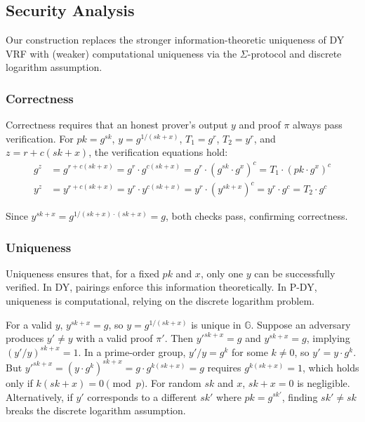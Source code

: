 \subsection{Security Analysis}

Our construction replaces the stronger information-theoretic uniqueness of DY VRF with (weaker) computational uniqueness via the $\Sigma$-protocol and discrete logarithm assumption.


\subsubsection{Correctness}

Correctness requires that an honest prover’s output $y$ and proof $\pi$ always pass verification. For $pk = g^{sk}$, $y = g^{1/(sk + x)}$, $T_1 = g^r$, $T_2 = y^r$, and $z = r + c(sk + x)$, the verification equations hold:
\begin{align*}
g^z &= g^{r + c(sk + x)} = g^r \cdot g^{c(sk + x)} = g^r \cdot (g^{sk} \cdot g^x)^c = T_1 \cdot (pk \cdot g^x)^c \\
y^z &= y^{r + c(sk + x)} = y^r \cdot y^{c(sk + x)} = y^r \cdot (y^{sk + x})^c = y^r \cdot g^c = T_2 \cdot g^c
\end{align*}

Since $y^{sk + x} = g^{1/(sk + x) \cdot (sk + x)} = g$, both checks pass, confirming correctness.

\subsubsection{Uniqueness}

Uniqueness ensures that, for a fixed $pk$ and $x$, only one $y$ can be successfully verified. In DY, pairings enforce this information theoretically. In P-DY, uniqueness is computational, relying on the discrete logarithm problem.

For a valid $y$, $y^{sk + x} = g$, so $y = g^{1/(sk + x)}$ is unique in $\mathbb{G}$. Suppose an adversary produces $y' \neq y$ with a valid proof $\pi'$. Then $y'^{sk + x} = g$ and $y^{sk + x} = g$, implying $(y'/y)^{sk + x} = 1$. In a prime-order group, $y'/y = g^k$ for some $k \neq 0$, so $y' = y \cdot g^k$. But $y'^{sk + x} = (y \cdot g^k)^{sk + x} = g \cdot g^{k(sk + x)} = g$ requires $g^{k(sk + x)} = 1$, which holds only if $k(sk + x) = 0 \pmod{p}$. For random $sk$ and $x$, $sk + x = 0$ is negligible. Alternatively, if $y'$ corresponds to a different $sk'$ where $pk = g^{sk'}$, finding $sk' \neq sk$ breaks the discrete logarithm assumption.

